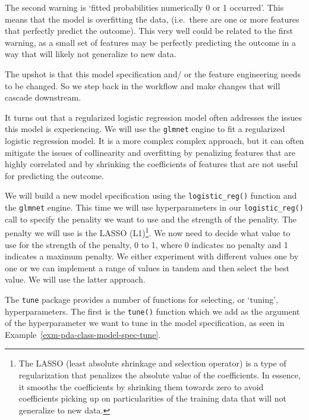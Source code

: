 \documentclass[
  letterpaper,
  DIV=11,
  numbers=noendperiod]{scrreprt}
\theoremstyle{definition}
\theoremstyle{remark}
\begin{document}
The second warning is `fitted probabilities numerically 0 or 1
occurred'. This means that the model is overfitting the data,
(i.e.~there are one or more features that perfectly predict the
outcome). This very well could be related to the first warning, as a
small set of features may be perfectly predicting the outcome in a way
that will likely not generalize to new data.

The upshot is that this model specification and/ or the feature
engineering needs to be changed. So we step back in the workflow and
make changes that will cascade downstream.

It turns out that a regularized logistic regression model often
addresses the issues this model is experiencing. We will use the
\texttt{glmnet} engine to fit a regularized logistic regression model.
It is a more complex complex approach, but it can often mitigate the
issues of collinearity and overfitting by penalizing features that are
highly correlated and by shrinking the coefficients of features that are
not useful for predicting the outcome.

We will build a new model specification using the
\texttt{logistic\_reg()} function and the \texttt{glmnet} engine. This
time we will use hyperparameters in our \texttt{logistic\_reg()} call to
specify the penality we want to use and the strength of the penality.
The penalty we will use is the LASSO (L1)\footnote{The LASSO (least
  absolute shrinkage and selection operator) is a type of regularization
  that penalizes the absolute value of the coefficients. In essence, it
  smooths the coefficients by shrinking them towards zero to avoid
  coefficients picking up on particularities of the training data that
  will not generalize to new data.}. We now need to decide what value to
use for the strength of the penalty, 0 to 1, where 0 indicates no
penalty and 1 indicates a maximum penalty. We either experiment with
different values one by one or we can implement a range of values in
tandem and then select the best value. We will use the latter approach.

The \texttt{tune} package provides a number of functions for selecting,
or `tuning', hyperparameters. The first is the \texttt{tune()} function
which we add as the argument of the hyperparameter we want to tune in
the model specification, as seen in
Example~\ref{exm-pda-class-model-spec-tune}.
\end{document}
